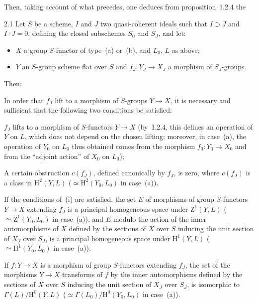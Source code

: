Then, taking account of what precedes, one deduces from
proposition~1.2.4 the{\renewcommand{\thefootnote}{(53)}}

\begin{theorem}{2.1}
\label{III.2.1}
Let \(S\) be a scheme, \(I\) and \(J\) two quasi-coherent ideals such that
\(I\supset J\) and \(I\cdot J=0\), defining the closed subschemes \(S_{0}\)
and \(S_{J}\), and let:
\begin{itemize}
\item[\textemdash] \(X\) a group \(S\)-functor of type~(a) or~(b), and
\(L_{0}\), \(L\) as above;
\item[\textemdash] \(Y\) an \(S\)-group scheme flat over \(S\) and
\(f_{J}\colon Y_{J}\to X_{J}\) a morphism of \(S_{J}\)-groups.
\end{itemize}
Then:
\begin{enumeratei}
\item In order that \(f_{J}\) lift to a morphism of \(S\)-groups
\(Y\to X\), it is necessary and sufficient that the following two conditions
be satisfied:
\begin{enumeratei}
\item[\textup{($i_{1}$)}] \(f_{J}\) lifts to a morphism of \(S\)-functors
\(Y\to X\) (by~1.2.4, this defines an operation of \(Y\) on \(L\), which does
not depend on the chosen lifting; moreover, in case~(a), the operation of
\(Y_{0}\) on \(L_{0}\) thus obtained comes from the morphism
\(f_{0}\colon Y_{0}\to X_{0}\) and from the ``adjoint action'' of \(X_{0}\)
on \(L_{0}\));
\item[\textup{($i_{2}$)}] A certain obstruction \(c(f_{J})\), defined
canonically by \(f_{J}\), is zero, where \(c(f_{J})\) is a class in
\(\mathrm{H}^{2}(Y,L)\)
(\(\simeq\mathrm{H}^{2}(Y_{0},L_{0})\) in case~(a)).
\end{enumeratei}
\item If the conditions of~(i) are satisfied, the set \(E\) of morphisms of
group \(S\)-functors \(Y\to X\) extending \(f_{J}\) is a principal homogeneous
space under \(\mathrm{Z}^{1}(Y,L)\)
(\(\simeq\mathrm{Z}^{1}(Y_{0},L_{0})\) in case~(a)), and \(E\) modulo the
action of the inner automorphisms of \(X\) defined by the sections of \(X\)
over \(S\) inducing the unit section of \(X_{J}\) over \(S_{J}\), is a
principal homogeneous space under \(\mathrm{H}^{1}(Y,L)\)
(\(\simeq\mathrm{H}^{1}(Y_{0},L_{0})\) in case~(a)).
\item If \(f\colon Y\to X\) is a morphism of group \(S\)-functors extending
\(f_{J}\), the set of the morphisms \(Y\to X\) transforms of \(f\) by the
inner automorphisms defined by the sections of \(X\) over \(S\) inducing the
unit section of \(X_{J}\) over \(S_{J}\), is isomorphic to
\(\Gamma(L)/\mathrm{H}^{0}(Y,L)\)
(\(\simeq\Gamma(L_{0})/\mathrm{H}^{0}(Y_{0},L_{0})\) in case~(a)).
\end{enumeratei}
\end{theorem}

